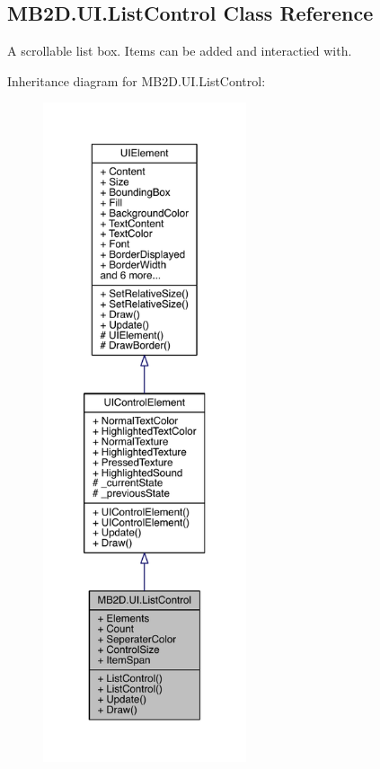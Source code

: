 \hypertarget{class_m_b2_d_1_1_u_i_1_1_list_control}{}\subsection{M\+B2\+D.\+U\+I.\+List\+Control Class Reference}
\label{class_m_b2_d_1_1_u_i_1_1_list_control}


A scrollable list box. Items can be added and interactied with.  




Inheritance diagram for M\+B2\+D.\+U\+I.\+List\+Control\+:
\nopagebreak
\begin{figure}[H]
\begin{center}
\leavevmode
\includegraphics[height=550pt]{class_m_b2_d_1_1_u_i_1_1_list_control__inherit__graph}
\end{center}
\end{figure}



